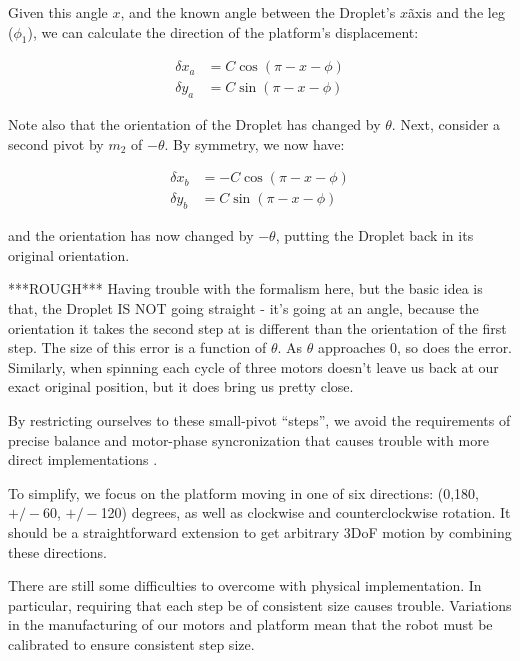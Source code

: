 \documentclass[letterpaper, 10pt, conference]{ieeeconf}
\begin{document}
Given this angle $x$, and the known angle between the Droplet's $x$\~axis and the leg ($\phi_1$), we can calculate the direction of the platform's displacement:

\begin{align}
\delta x_a &= C \cos(\pi - x - \phi)\\
\nonumber
\delta y_a &= C \sin(\pi - x - \phi)
\end{align}

Note also that the orientation of the Droplet has changed by $\theta$. Next, consider a second pivot by $m_2$ of $-\theta$. By symmetry, we now have:

\begin{align*}
\delta x_b &= -C\cos(\pi -x -\phi)\\
\delta y_b &= C \sin(\pi - x - \phi)
\end{align*}

and the orientation has now changed by $-\theta$, putting the Droplet back in its original orientation. 

***ROUGH***
Having trouble with the formalism here, but the basic idea is that, the Droplet IS NOT going straight - it's going at an angle, because the orientation it takes the second step at is different than the orientation of the first step. The size of this error is a function of $\theta$. As $\theta$ approaches $0$, so does the error. Similarly, when spinning each cycle of three motors doesn't leave us back at our exact original position, but it does bring us pretty close.

By restricting ourselves to these small-pivot ``steps'', we avoid the requirements of precise balance and motor-phase syncronization that causes trouble with more direct implementations \cite{Vartholomeos2006}.

To simplify, we focus on the platform moving in one of six directions: (0,180, $+/-$60, $+/-$120) degrees, as well as clockwise and counterclockwise rotation. It should be a straightforward extension to get arbitrary 3DoF motion by combining these directions.

There are still some difficulties to overcome with physical implementation. In particular, requiring that each step be of consistent size causes trouble. Variations in the manufacturing of our motors and platform mean that the robot must be calibrated to ensure consistent step size.
\end{document}
